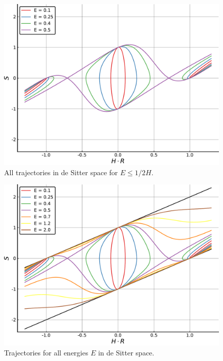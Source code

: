 \begin{figure}
    \centering
    \includegraphics[width = 0.93 \linewidth]{Pictures/DeSitter_labile.pdf}
    \caption{All trajectories in de Sitter space for $E \leq 1/2H$.}
    \label{fig:desiter_labile}
\end{figure}

\begin{figure}
    \centering
    \includegraphics[width = 0.93 \linewidth]{Pictures/DeSitter_unstable.pdf}
    \caption{Trajectories for all energies $E$ in de Sitter space.}
    \label{fig:desiter_unstable}
\end{figure}

